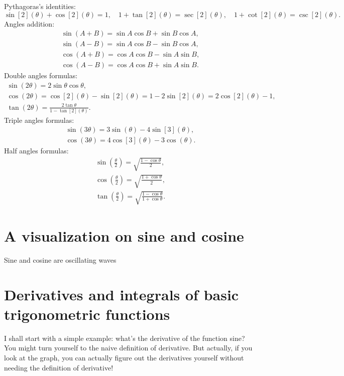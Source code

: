 Pythagoras's identities:
\begin{equation*}
    \sin[2](\theta) + \cos[2](\theta) = 1,\quad 1 + \tan[2](\theta) = \sec[2](\theta), \quad 1 + \cot[2](\theta) = \csc[2](\theta).
\end{equation*}
Angles addition:
\begin{gather*}
    \sin(A + B) = \sin A\cos B + \sin B\cos A, \\
    \sin(A - B) = \sin A\cos B - \sin B\cos A, \\
    \cos(A + B) = \cos A\cos B - \sin A\sin B, \\
    \cos(A - B) = \cos A\cos B + \sin A\sin B. 
\end{gather*}
Double angles formulas:
\begin{gather*}
    \sin(2\theta) = 2\sin\theta\cos\theta, \\
    \cos(2\theta) = \cos[2](\theta) - \sin[2](\theta) = 1 - 2\sin[2](\theta) = 2\cos[2](\theta) - 1, \\
    \tan(2\theta) = \frac{2\tan\theta}{1 - \tan[2](\theta)}.
\end{gather*}
Triple angles formulas:
\begin{gather*}
    \sin(3\theta) = 3\sin(\theta) - 4\sin[3](\theta), \\
    \cos(3\theta) = 4\cos[3](\theta) - 3\cos(\theta).
\end{gather*}
Half angles formulas:
\begin{gather*}
    \sin(\frac{\theta}{2}) = \sqrt{\frac{1 - \cos\theta}{2}}, \\
    \cos(\frac{\theta}{2}) = \sqrt{\frac{1 + \cos\theta}{2}}, \\
    \tan(\frac{\theta}{2}) = \sqrt{\frac{1 - \cos\theta}{1 + \cos\theta}}.
\end{gather*}

\section{A visualization on sine and cosine}

Sine and cosine are oscillating waves

\section{Derivatives and integrals of basic trigonometric functions}

I shall start with a simple example: what's the derivative of the function sine? You might turn yourself to the naive definition of derivative. But actually, if you look at the graph, you can actually figure out the derivatives yourself without needing the definition of derivative!

